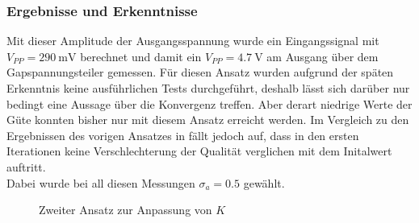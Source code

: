 \documentclass[../Report.tex]{subfiles}
\begin{document}
\subsubsection*{Ergebnisse und Erkenntnisse}
\label{subsubsec:opt.adjusta.kleiner.results}
Mit dieser Amplitude der Ausgangsspannung wurde ein Eingangssignal mit $V_{PP} = \SI{290}{\mV}$ berechnet und damit ein $V_{PP} = \SI{4.7}{\V}$ am Ausgang über dem Gapspannungsteiler gemessen. Für diesen Ansatz wurden aufgrund der späten Erkenntnis keine ausführlichen Tests durchgeführt, deshalb lässt sich darüber nur bedingt eine Aussage über die Konvergenz treffen. Aber derart niedrige Werte der Güte konnten bisher nur mit diesem Ansatz erreicht werden. Im Vergleich zu den Ergebnissen des vorigen Ansatzes in  fällt jedoch auf, dass in den ersten Iterationen keine Verschlechterung der Qualität verglichen mit dem Initalwert auftritt.
\\
Dabei wurde bei all diesen Messungen $\sigma_a = 0.5$ gewählt.
\begin{figure}[H]
\begin{subfigure}{0.5 \textwidth}
	\setlength\figureheight{7.5cm}
	\setlength\figurewidth{7.5cm}
    
	\label{fig:opt.kleinerBereich.K}
\end{subfigure}
\begin{subfigure}{0.5 \textwidth}
	\setlength\figureheight{7.5cm}
	\setlength\figurewidth{7.5cm}
    
	\label{fig:opt.kleinerBereich.Q}
\end{subfigure}
\label{fig:opt.Kennlinie}
\caption{Zweiter Ansatz zur Anpassung von $K$}
\end{figure}
\end{document}
